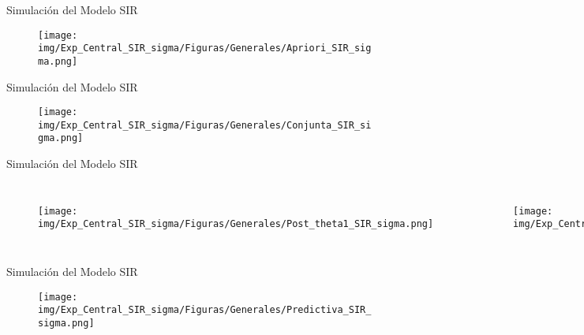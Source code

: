 \documentclass[10pt,aspectratio=169]{beamer}
\begin{document}
\begin{frame}{Simulación del Modelo SIR}
  \begin{figure}[H] 
    \centering 
    \texttt{[image: img/Exp\_Central\_SIR\_sigma/Figuras/Generales/Apriori\_SIR\_sigma.png]} 
    \label{Fig. SIR_02}
  \end{figure} 
\end{frame}



\begin{frame}{Simulación del Modelo SIR}
  \begin{figure}[H] 
    \centering 
    \texttt{[image: img/Exp\_Central\_SIR\_sigma/Figuras/Generales/Conjunta\_SIR\_sigma.png]} 
    \label{Fig. SIR_03}
  \end{figure} 
\end{frame}

\begin{frame}{Simulación del Modelo SIR}
  \begin{columns}[T,onlytextwidth]
    
    \begin{figure}
      \centering 
      \texttt{[image: img/Exp\_Central\_SIR\_sigma/Figuras/Generales/Post\_theta1\_SIR\_sigma.png]}
    \end{figure} 
    
    
      
    \begin{figure}
      \centering 
      \texttt{[image: img/Exp\_Central\_SIR\_sigma/Figuras/Generales/Post\_theta2\_SIR\_sigma.png]}
    \end{figure} 
    
  \end{columns}
\end{frame}

\begin{frame}{Simulación del Modelo SIR}
  
  \begin{figure}[H] 
    \centering 
    \texttt{[image: img/Exp\_Central\_SIR\_sigma/Figuras/Generales/Predictiva\_SIR\_sigma.png]} 
    \label{Fig. SIR_06}
  \end{figure} 
\end{frame}
\end{document}
